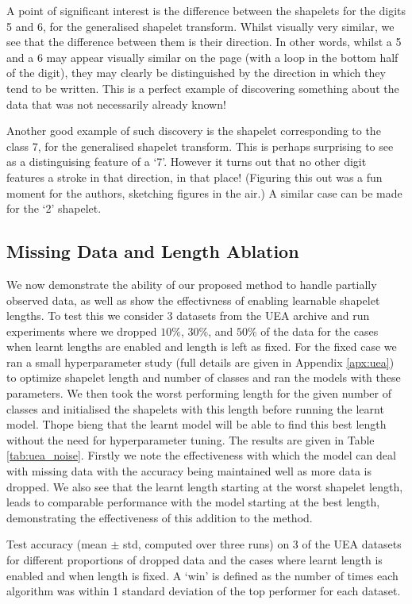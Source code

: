 \documentclass{article}
\theoremstyle{plain}
\theoremstyle{definition}
\begin{document}
A point of significant interest is the difference between the shapelets for the digits 5 and 6, for the generalised shapelet transform. Whilst visually very similar, we see that the difference between them is their direction. In other words, whilst a 5 and a 6 may appear visually similar on the page (with a loop in the bottom half of the digit), they may clearly be distinguished by the direction in which they tend to be written. This is a perfect example of discovering something about the data that was not necessarily already known!

Another good example of such discovery is the shapelet corresponding to the class 7, for the generalised shapelet transform. This is perhaps surprising to see as a distinguising feature of a `7'. However it turns out that no other digit features a stroke in that direction, in that place! (Figuring this out was a fun moment for the authors, sketching figures in the air.) A similar case can be made for the `2' shapelet.

\subsection{Missing Data and Length Ablation} \label{subsec:uea_missing_and_length}
	We now demonstrate the ability of our proposed method to handle partially observed data, as well as show the effectivness of enabling learnable shapelet lengths. To test this we consider 3 datasets from the UEA archive and run experiments where we dropped $10\%$, $30\%$, and $50\%$ of the data for the cases when learnt lengths are enabled and length is left as fixed. For the fixed case we ran a small hyperparameter study (full details are given in Appendix \ref{apx:uea}) to optimize shapelet length and number of classes and ran the models with these parameters. We then took the worst performing length for the given number of classes and initialised the shapelets with this length before running the learnt model. Thope bieng that the learnt model will be able to find this best length without the need for hyperparameter tuning. The results are given in Table \ref{tab:uea_noise}. Firstly we note the effectiveness with which the model can deal with missing data with the accuracy being maintained well as more data is dropped. We also see that the learnt length starting at the worst shapelet length, leads to comparable performance with the model starting at the best length, demonstrating the effectiveness of this addition to the method.
\begin{table}[ht]
    \label{tab:uea_noise}
    \centering
    
	\caption{Test accuracy (mean $\pm$ std, computed over three runs) on 3 of the UEA datasets for different proportions of dropped data and the cases where learnt length is enabled and when length is fixed. A `win' is defined as the number of times each algorithm was within 1 standard deviation of the top performer for each dataset.}
\end{table}
\end{document}
